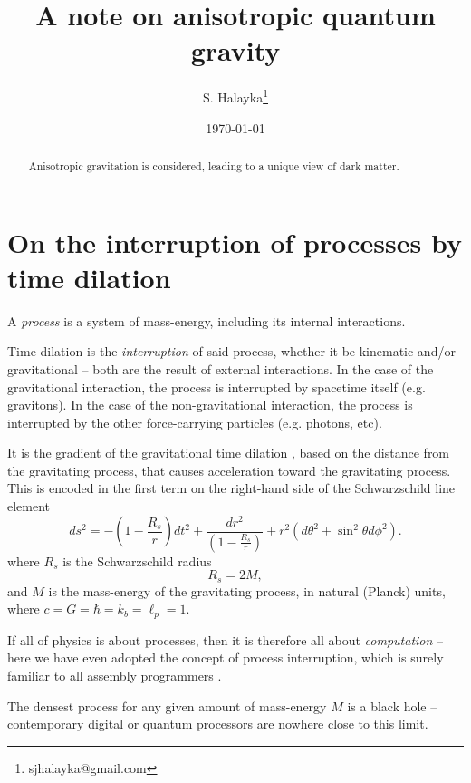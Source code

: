 \documentclass[12pt]{article}
\title{A note on anisotropic quantum gravity}
\author{S. Halayka\footnote{sjhalayka@gmail.com}}
\date{\today\;\currenttime}
\begin{document}
 
\maketitle

\begin{abstract}
Anisotropic gravitation is considered, leading to a unique view of dark matter.
\end{abstract}






\section{On the interruption of processes by time dilation}

A {\textit{process}} is a system of mass-energy, including its internal interactions.

Time dilation is the {\textit{interruption}} of said process, whether it be kinematic and/or gravitational -- both are the result of external interactions.
In the case of the gravitational interaction, the process is interrupted by spacetime itself (e.g. gravitons).
In the case of the non-gravitational interaction, the process is interrupted by the other force-carrying particles (e.g. photons, etc).

It is the gradient of the gravitational time dilation \cite{misner}, based on the distance from the gravitating process, that causes acceleration toward the gravitating process.
This is encoded in the first term on the right-hand side of the Schwarzschild line element
\begin{equation}
ds^2 = -\left( 1 - \frac{R_s}{r} \right) dt^2 + \frac{dr^2}{\left( 1 - \frac{R_s}{r} \right)} + r^2 (d\theta^2 + \sin^2 \theta d\phi^2).
\end{equation}
where $R_s$ is the Schwarzschild radius
\begin{equation}
R_s = 2M,
\end{equation}
and $M$ is the mass-energy of the gravitating process, in natural (Planck) units, where $c = G = \hbar = k_b =	 \ell_p = 1$.

If all of physics is about processes, then it is therefore all about {\textit{computation}} \cite{zuse, wolfram} -- here we have even adopted the concept of process interruption, which is surely familiar to all assembly programmers \cite{abrash}.

The densest process for any given amount of mass-energy $M$ is a black hole -- contemporary digital or quantum processors are nowhere close to this limit.
\end{document}
